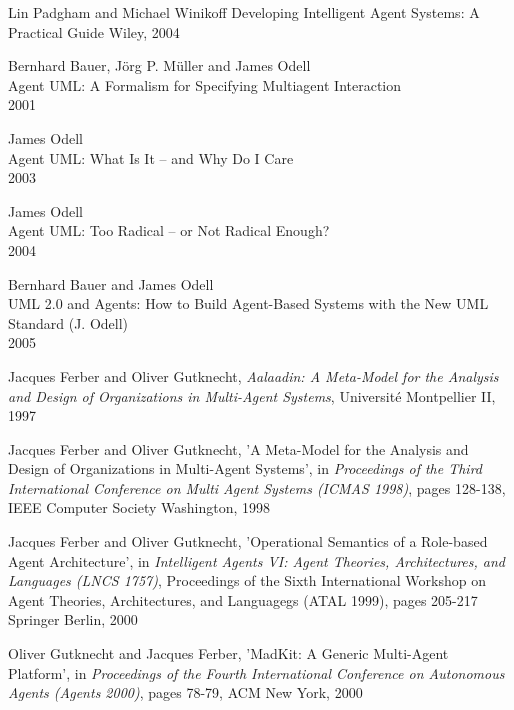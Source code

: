 \begin{thebibliography}{99}
Lin Padgham and Michael Winikoff
Developing Intelligent Agent Systems: A Practical Guide
Wiley, 2004


Bernhard Bauer, J\"{o}rg P. M\"{u}ller and James Odell\\
Agent UML: A Formalism for Specifying Multiagent Interaction\\
2001

James Odell\\
Agent UML: What Is It -- and Why Do I Care\\
2003

James Odell\\
Agent UML: Too Radical -- or Not Radical Enough?\\
2004

Bernhard Bauer and James Odell\\
UML 2.0 and Agents: How to Build Agent-Based Systems with the New UML Standard (J. Odell)\\
2005


Jacques Ferber and Oliver Gutknecht,
\textit{Aalaadin: A Meta-Model for the Analysis and Design of Organizations in Multi-Agent Systems},
Université Montpellier II, 1997

Jacques Ferber and Oliver Gutknecht,
'A Meta-Model for the Analysis and Design of Organizations in Multi-Agent Systems',
in \textit{Proceedings of the Third International Conference on Multi Agent Systems (ICMAS 1998)},
pages 128-138, 
IEEE Computer Society Washington, 1998

Jacques Ferber and Oliver Gutknecht,
'Operational Semantics of a Role-based Agent Architecture',
in \textit{Intelligent Agents VI: Agent Theories, Architectures, and Languages (LNCS 1757)},
Proceedings of the Sixth International Workshop on Agent Theories, Architectures, and Languagegs (ATAL 1999),
pages 205-217
Springer Berlin, 2000

Oliver Gutknecht and Jacques Ferber,
'MadKit: A Generic Multi-Agent Platform',
in \textit{Proceedings of the Fourth International Conference on Autonomous Agents (Agents 2000)},
pages 78-79,
ACM New York, 2000


\end{thebibliography}

